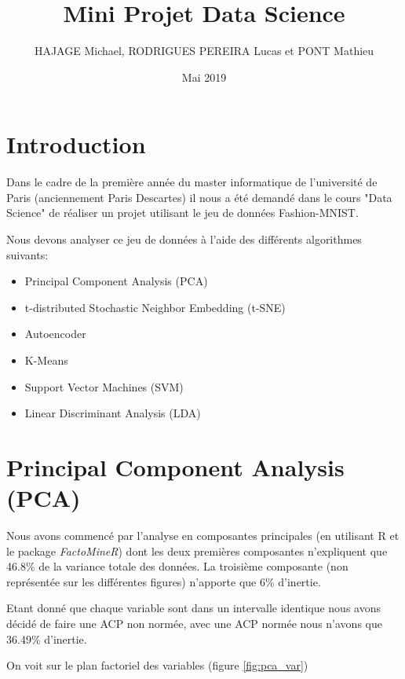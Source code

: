 \documentclass{article}
\title{Mini Projet Data Science}
\author{HAJAGE Michael, RODRIGUES PEREIRA Lucas et PONT Mathieu}
\date{Mai 2019}
\begin{document}
\maketitle

\section{Introduction}
Dans le cadre de la première année du master informatique de l'université de Paris (anciennement Paris Descartes) il nous a été demandé dans le cours "Data Science" de réaliser un projet utilisant le jeu de données Fashion-MNIST. 

Nous devons analyser ce jeu de données à l'aide des différents algorithmes suivants:

\begin{itemize}
\item Principal Component Analysis (PCA)
\item t-distributed Stochastic Neighbor Embedding (t-SNE)
\item Autoencoder
\item K-Means
\item Support Vector Machines (SVM)
\item Linear Discriminant Analysis (LDA)
\end{itemize}

\section{Principal Component Analysis (PCA)}

Nous avons commencé par l'analyse en composantes principales (en utilisant R et le package \textit{FactoMineR}) dont les deux premières composantes n'expliquent que 46.8\% de la variance totale des données. La troisième composante (non représentée sur les différentes figures) n'apporte que 6\% d'inertie.

Etant donné que chaque variable sont dans un intervalle identique nous avons décidé de faire une ACP non normée, avec une ACP normée nous n'avons que 36.49\% d'inertie.

On voit sur le plan factoriel des variables (figure \ref{fig:pca_var})
\end{document}
